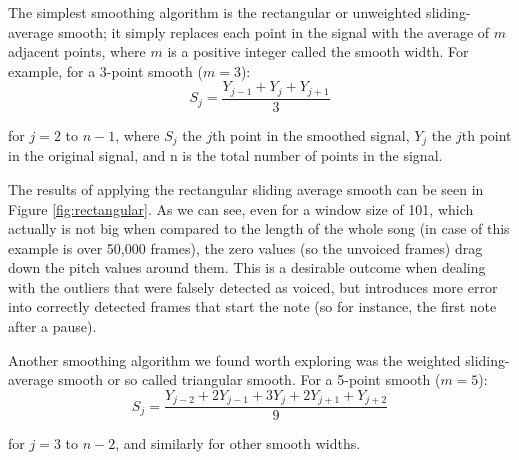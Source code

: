 The simplest smoothing algorithm is the rectangular or unweighted sliding-average smooth; it simply replaces each point in the signal with the average of $m$ adjacent points, where $m$ is a positive integer called the smooth width. For example, for a 3-point smooth ($m = 3$):
\begin{equation}
	S_{j} = \frac{Y_{j-1} + Y_{j} + Y_{j+1}}{3}
\end{equation}

for $j = 2$ to $n-1$, where $S_{j}$ the $j$th point in the smoothed signal, $Y_{j}$ the $j$th point in the original signal, and n is the total number of points in the signal. 

The results of applying the rectangular sliding average smooth can be seen in Figure \ref{fig:rectangular}. As we can see, even for a window size of 101, which actually is not big when compared to the length of the whole song (in case of this example is over 50,000 frames), the zero values (so the unvoiced frames) drag down the pitch values around them. This is a desirable outcome when dealing with the outliers that were falsely detected as voiced, but introduces more error into correctly detected frames that start the note (so for instance, the first note after a pause).

Another smoothing algorithm we found worth exploring was the weighted sliding-average smooth or so called triangular smooth. 
For a 5-point smooth ($m = 5$):
\begin{equation}
S_{j} = \frac{Y_{j-2} + 2Y_{j-1} + 3Y_{j} + 2Y_{j+1} + Y_{j+2}}{9}
\end{equation}
 
for $j = 3$ to $n-2$, and similarly for other smooth widths. 


